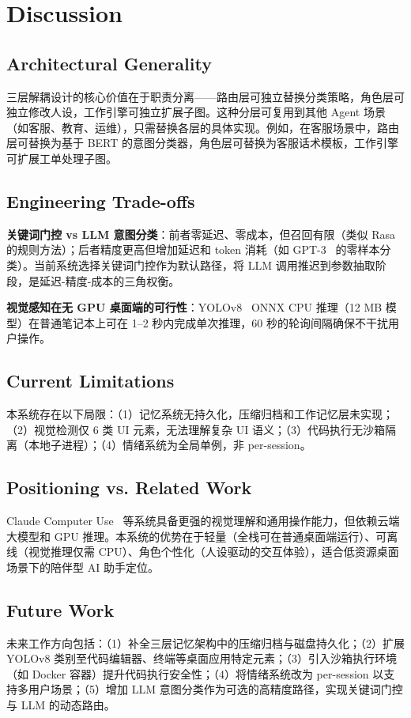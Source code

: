 \section{Discussion}

\subsection{Architectural Generality}

三层解耦设计的核心价值在于职责分离——路由层可独立替换分类策略，角色层可独立修改人设，工作引擎可独立扩展子图。这种分层可复用到其他 Agent 场景（如客服、教育、运维），只需替换各层的具体实现。例如，在客服场景中，路由层可替换为基于 BERT 的意图分类器，角色层可替换为客服话术模板，工作引擎可扩展工单处理子图。

\subsection{Engineering Trade-offs}

\textbf{关键词门控 vs LLM 意图分类}：前者零延迟、零成本，但召回有限（类似 Rasa~\cite{bocklisch2017rasa} 的规则方法）；后者精度更高但增加延迟和 token 消耗（如 GPT-3~\cite{brown2020gpt3} 的零样本分类）。当前系统选择关键词门控作为默认路径，将 LLM 调用推迟到参数抽取阶段，是延迟-精度-成本的三角权衡。

\textbf{视觉感知在无 GPU 桌面端的可行性}：YOLOv8~\cite{jocher2023yolov8} ONNX CPU 推理（12 MB 模型）在普通笔记本上可在 1--2 秒内完成单次推理，60 秒的轮询间隔确保不干扰用户操作。

\subsection{Current Limitations}

本系统存在以下局限：（1）记忆系统无持久化，压缩归档和工作记忆层未实现；（2）视觉检测仅 6 类 UI 元素，无法理解复杂 UI 语义；（3）代码执行无沙箱隔离（本地子进程）；（4）情绪系统为全局单例，非 per-session。

\subsection{Positioning vs. Related Work}

Claude Computer Use~\cite{anthropic2024computeruse} 等系统具备更强的视觉理解和通用操作能力，但依赖云端大模型和 GPU 推理。本系统的优势在于轻量（全栈可在普通桌面端运行）、可离线（视觉推理仅需 CPU）、角色个性化（人设驱动的交互体验），适合低资源桌面场景下的陪伴型 AI 助手定位。

\subsection{Future Work}

未来工作方向包括：（1）补全三层记忆架构中的压缩归档与磁盘持久化；（2）扩展 YOLOv8 类别至代码编辑器、终端等桌面应用特定元素；（3）引入沙箱执行环境（如 Docker 容器）提升代码执行安全性；（4）将情绪系统改为 per-session 以支持多用户场景；（5）增加 LLM 意图分类作为可选的高精度路径，实现关键词门控与 LLM 的动态路由。
